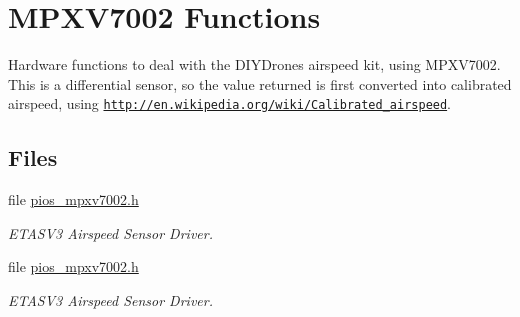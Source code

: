 \hypertarget{group___p_i_o_s___m_p_x_v7002}{\section{M\-P\-X\-V7002 Functions}
\label{group___p_i_o_s___m_p_x_v7002}
}


Hardware functions to deal with the D\-I\-Y\-Drones airspeed kit, using M\-P\-X\-V7002. This is a differential sensor, so the value returned is first converted into calibrated airspeed, using \href{http://en.wikipedia.org/wiki/Calibrated_airspeed}{\tt http\-://en.\-wikipedia.\-org/wiki/\-Calibrated\-\_\-airspeed}.  


\subsection*{Files}
\begin{DoxyCompactItemize}
\item 
file \hyperlink{pios__mpxv7002_8h}{pios\-\_\-mpxv7002.\-h}
\begin{DoxyCompactList}\small\item\em E\-T\-A\-S\-V3 Airspeed Sensor Driver. \end{DoxyCompactList}\item 
file \hyperlink{pios__mpxv7002_8h}{pios\-\_\-mpxv7002.\-h}
\begin{DoxyCompactList}\small\item\em E\-T\-A\-S\-V3 Airspeed Sensor Driver. \end{DoxyCompactList}\end{DoxyCompactItemize}
